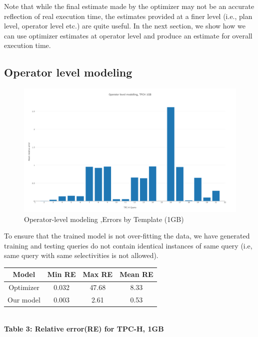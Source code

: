 \documentclass{article}
\begin{document}
\begin{multicols}{2}
	Note that while the final estimate made by the optimizer may not be an accurate reflection of
	real execution time, the estimates provided at a finer level (i.e., plan level, operator level etc.) 
	are quite useful. In the next section, we show how we can use optimizer estimates at operator level 
	and produce an estimate for overall execution time.
	
	\subsection{Operator level modeling}
	\begin{figure}[!t]
	  \includegraphics[width=\textwidth]{tpch-1gbres.png}
	  \caption{{Operator-level modeling ,Errors by Template (1GB)}}
	\end{figure}
	
	To ensure that the trained model is not over-fitting the data, we have generated training and testing queries do not contain identical instances of same query (i.e, same query with same selectivities is not allowed). 
	
	\begin{center}
	\begin{tabular}{|c|c|c|c|} 
	\hline
	  Model & Min RE & Max RE & Mean RE \\ 	 \hline
	 Optimizer & 0.032  & 47.68 & 8.33 \\ \hline
	 Our model & 0.003 & 2.61 & 0.53 \\ \hline
	\end{tabular}
	\\
	\vspace{.5cm}
	\textbf{Table 3: Relative error(RE) for TPC-H, 1GB}
	\end{center}


\end{multicols}
\end{document}
